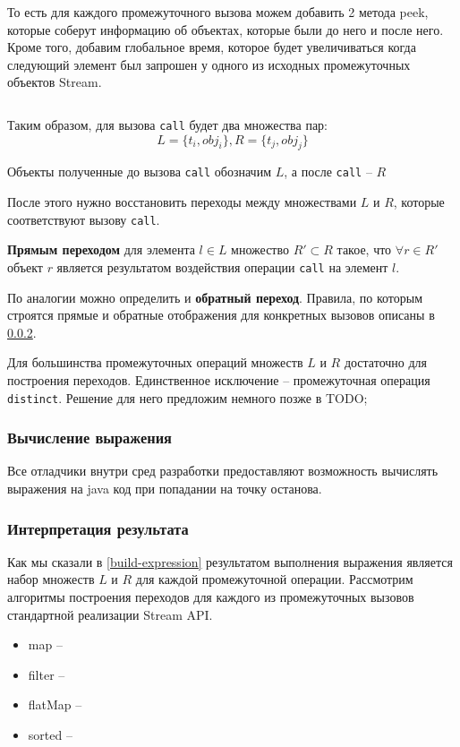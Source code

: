 То есть для каждого промежуточного вызова можем добавить 2 метода peek, которые соберут информацию об объектах, которые были до него и после него. Кроме того, добавим глобальное время, которое будет увеличиваться когда следующий элемент был запрошен у одного из исходных промежуточных объектов Stream.

\inputminted{java}{chapter2/code/LocalChainModification.java}

Таким образом, для вызова \texttt{call} будет два множества пар: 
\begin{equation*}
	L = \{t_i, obj_i\}, R = \{t_j, obj_j\}
\end{equation*}

Объекты полученные до вызова \texttt{call} обозначим $L$, а после \texttt{call} -- $R$

После этого нужно восстановить переходы между множествами $L$ и $R$, которые соответствуют вызову \texttt{call}.

\textbf{Прямым переходом} для элемента $l \in L$ множество $R' \subset R$ такое, что $\forall r \in R'$ объект $r$ является результатом воздействия операции \texttt{call} на элемент $l$.

По аналогии можно определить и \textbf{обратный переход}.
Правила, по которым строятся прямые и обратные отображения для конкретных вызовов описаны в \ref{interpret}.

Для большинства промежуточных операций множеств $L$ и $R$ достаточно для построения переходов. Единственное исключение -- промежуточная операция \texttt{distinct}. Решение для него предложим немного позже в TODO;

\subsubsection{Вычисление выражения}
Все отладчики внутри сред разработки предоставляют возможность вычислять выражения на java код при попадании на точку останова.

\subsubsection{Интерпретация результата}\label{interpret}

Как мы сказали в \ref{build-expression} результатом выполнения выражения является набор множеств $L$ и $R$ для каждой промежуточной операции. Рассмотрим алгоритмы построения переходов для каждого из промежуточных вызовов стандартной реализации Stream API.
\begin{itemize}
	\item map -- 
	\item filter --
	\item flatMap --
	\item sorted --
\end{itemize}

